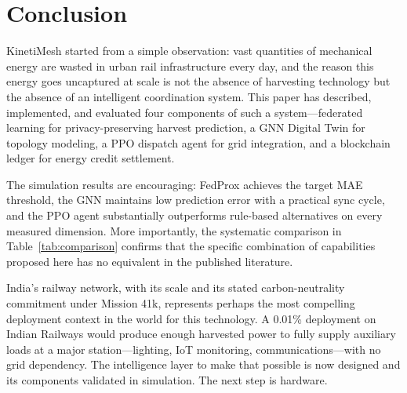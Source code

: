 \documentclass[conference]{IEEEtran}
\begin{document}
\section{Conclusion}

KinetiMesh started from a simple observation: vast quantities of mechanical energy are wasted in urban rail infrastructure every day, and the reason this energy goes uncaptured at scale is not the absence of harvesting technology but the absence of an intelligent coordination system. This paper has described, implemented, and evaluated four components of such a system—federated learning for privacy-preserving harvest prediction, a GNN Digital Twin for topology modeling, a PPO dispatch agent for grid integration, and a blockchain ledger for energy credit settlement.

The simulation results are encouraging: FedProx achieves the target MAE threshold, the GNN maintains low prediction error with a practical sync cycle, and the PPO agent substantially outperforms rule-based alternatives on every measured dimension. More importantly, the systematic comparison in Table~\ref{tab:comparison} confirms that the specific combination of capabilities proposed here has no equivalent in the published literature.

India's railway network, with its scale and its stated carbon-neutrality commitment under Mission 41k, represents perhaps the most compelling deployment context in the world for this technology. A 0.01\% deployment on Indian Railways would produce enough harvested power to fully supply auxiliary loads at a major station—lighting, IoT monitoring, communications—with no grid dependency. The intelligence layer to make that possible is now designed and its components validated in simulation. The next step is hardware.

\balance
\end{document}
